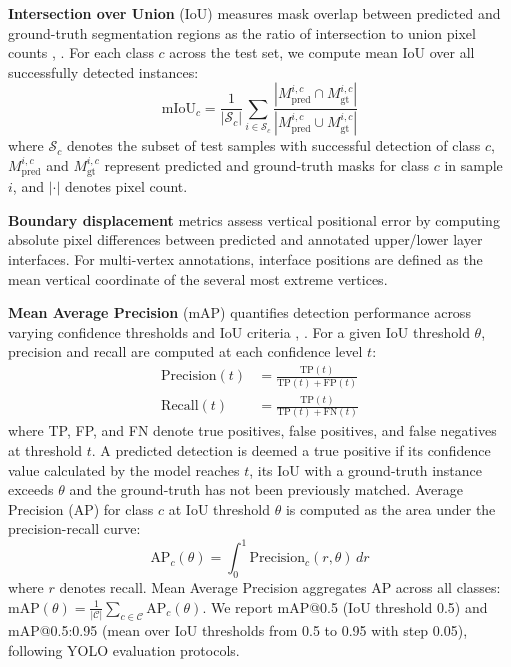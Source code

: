 \textbf{Intersection over Union} (IoU) measures mask overlap between predicted and ground-truth segmentation regions as the ratio of intersection to union pixel counts \cite{iou_1}, \cite{iou_2}. For each class $c$ across the test set, we compute mean IoU over all successfully detected instances:
\begin{equation}
\text{mIoU}_c = \frac{1}{|\mathcal{S}_c|} \sum_{i \in \mathcal{S}_c} \frac{|M_{\text{pred}}^{i,c} \cap M_{\text{gt}}^{i,c}|}{|M_{\text{pred}}^{i,c} \cup M_{\text{gt}}^{i,c}|}
\end{equation}
where $\mathcal{S}_c$ denotes the subset of test samples with successful detection of class $c$, $M_{\text{pred}}^{i,c}$ and $M_{\text{gt}}^{i,c}$ represent predicted and ground-truth masks for class $c$ in sample $i$, and $|\cdot|$ denotes pixel count. 

\textbf{Boundary displacement} metrics assess vertical positional error by computing absolute pixel differences between predicted and annotated upper/lower layer interfaces. For multi-vertex annotations, interface positions are defined as the mean vertical coordinate of the several most extreme vertices.

\textbf{Mean Average Precision} (mAP) quantifies detection performance across varying confidence thresholds and IoU criteria \cite{map_1}, \cite{map_2}. For a given IoU threshold $\theta$, precision and recall are computed at each confidence level $t$:
\begin{equation}
\begin{aligned}
\text{Precision}(t) &= \frac{\text{TP}(t)}{\text{TP}(t) + \text{FP}(t)} \\
\text{Recall}(t) &= \frac{\text{TP}(t)}{\text{TP}(t) + \text{FN}(t)}
\end{aligned}
\end{equation}
where TP, FP, and FN denote true positives, false positives, and false negatives at threshold $t$. A predicted detection is deemed a true positive if its confidence value calculated by the model reaches $t$, its IoU with a ground-truth instance exceeds $\theta$ and the ground-truth has not been previously matched. Average Precision (AP) for class $c$ at IoU threshold $\theta$ is computed as the area under the precision-recall curve:
\begin{equation}
\text{AP}_c(\theta) = \int_{0}^{1} \text{Precision}_c(r, \theta) \, dr
\end{equation}
where $r$ denotes recall. Mean Average Precision aggregates AP across all classes: $\text{mAP}(\theta) = \frac{1}{|\mathcal{C}|} \sum_{c \in \mathcal{C}} \text{AP}_c(\theta)$. We report mAP@0.5 (IoU threshold 0.5) and mAP@0.5:0.95 (mean over IoU thresholds from 0.5 to 0.95 with step 0.05), following YOLO evaluation protocols.

